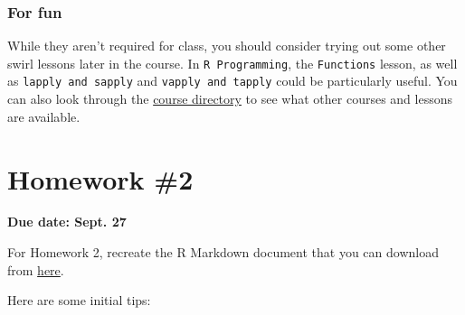 \documentclass[]{book}
\theoremstyle{definition}
\theoremstyle{definition}
\theoremstyle{definition}
\theoremstyle{remark}
\begin{document}
\subsubsection{For fun}\label{for-fun}

While they aren't required for class, you should consider trying out
some other swirl lessons later in the course. In
\texttt{R\ Programming}, the \texttt{Functions} lesson, as well as
\texttt{lapply\ and\ sapply} and \texttt{vapply\ and\ tapply} could be
particularly useful. You can also look through the
\href{http://swirlstats.com/scn/title.html}{course directory} to see
what other courses and lessons are available.

\section{Homework \#2}\label{homework-2}

\textbf{Due date: Sept. 27}

For Homework 2, recreate the R Markdown document that you can download
from
\href{https://github.com/geanders/RProgrammingForResearch/raw/master/Homework/Homework_2.docx}{here}.

Here are some initial tips:
\end{document}
